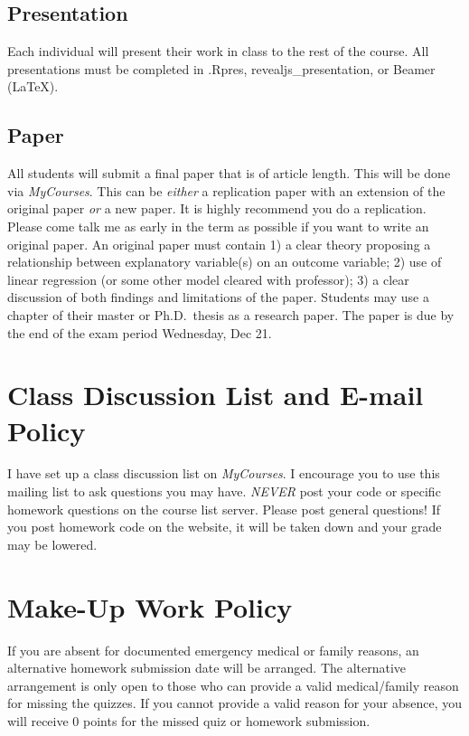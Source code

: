 \documentclass[11pt,]{article}
\begin{document}
\subsection{Presentation}\label{presentation}

Each individual will present their work in class to the rest of the
course. All presentations must be completed in .Rpres,
revealjs\_presentation, or Beamer (LaTeX).

\subsection{Paper}\label{paper}

All students will submit a final paper that is of article length. This
will be done via \emph{MyCourses}. This can be \emph{either} a
replication paper with an extension of the original paper \emph{or} a
new paper. It is highly recommend you do a replication. Please come talk
me as early in the term as possible if you want to write an original
paper. An original paper must contain 1) a clear theory proposing a
relationship between explanatory variable(s) on an outcome variable; 2)
use of linear regression (or some other model cleared with professor);
3) a clear discussion of both findings and limitations of the paper.
Students may use a chapter of their master or Ph.D.~thesis as a research
paper. The paper is due by the end of the exam period Wednesday, Dec 21.

\section{Class Discussion List and E-mail
Policy}\label{class-discussion-list-and-e-mail-policy}

I have set up a class discussion list on \emph{MyCourses}. I encourage
you to use this mailing list to ask questions you may have. \emph{NEVER}
post your code or specific homework questions on the course list server.
Please post general questions! If you post homework code on the website,
it will be taken down and your grade may be lowered.

\section{Make-Up Work Policy}\label{make-up-work-policy}

If you are absent for documented emergency medical or family reasons, an
alternative homework submission date will be arranged. The alternative
arrangement is only open to those who can provide a valid medical/family
reason for missing the quizzes. If you cannot provide a valid reason for
your absence, you will receive 0 points for the missed quiz or homework
submission.
\end{document}
